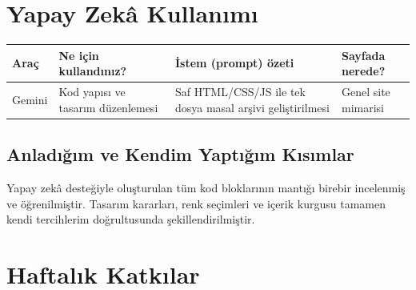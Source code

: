 \documentclass[12pt,a4paper]{article}
\begin{document}
\section{Yapay Zekâ Kullanımı}

\begin{longtable}{@{}p{2.6cm}p{3.6cm}p{4.2cm}p{3.4cm}@{}}
\toprule
\textbf{Araç} & \textbf{Ne için kullandınız?} & \textbf{İstem (prompt) özeti} & \textbf{Sayfada nerede?} \\
\midrule
\endhead
Gemini & Kod yapısı ve tasarım düzenlemesi & Saf HTML/CSS/JS ile tek dosya masal arşivi geliştirilmesi & Genel site mimarisi \\
\bottomrule
\end{longtable}

\subsection{Anladığım ve Kendim Yaptığım Kısımlar}
Yapay zekâ desteğiyle oluşturulan tüm kod bloklarının mantığı birebir incelenmiş ve öğrenilmiştir. Tasarım kararları, renk seçimleri ve içerik kurgusu tamamen kendi tercihlerim doğrultusunda şekillendirilmiştir.

\section{Haftalık Katkılar}
\end{document}
